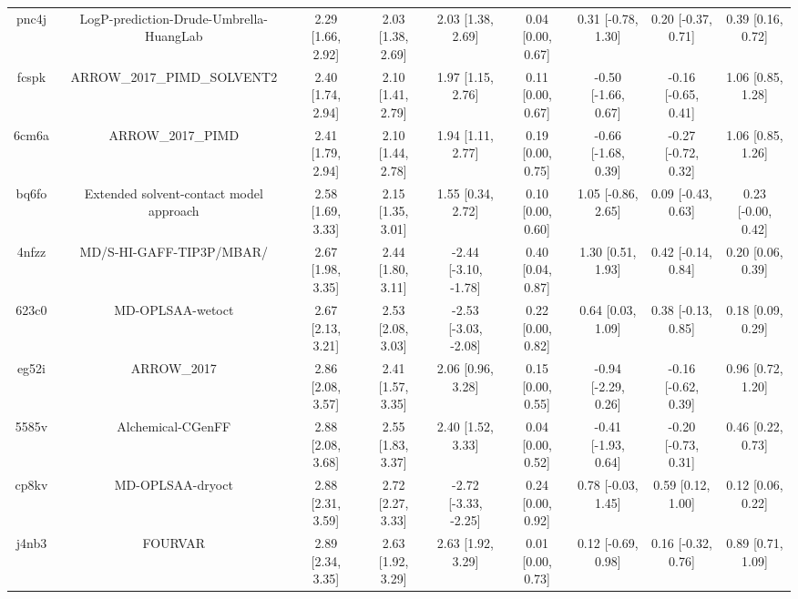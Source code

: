 \documentclass{article}
\begin{document}
\begin{center}
\begin{longtable}{|ccccccccc|}
 pnc4j &            LogP-prediction-Drude-Umbrella-HuangLab &  2.29 [1.66, 2.92] &  2.03 [1.38, 2.69] &     2.03 [1.38, 2.69] &  0.04 [0.00, 0.67] &   0.31 [-0.78, 1.30] &   0.20 [-0.37, 0.71] &     0.39 [0.16, 0.72] \\
 fcspk &                        ARROW\_2017\_PIMD\_SOLVENT2 &  2.40 [1.74, 2.94] &  2.10 [1.41, 2.79] &     1.97 [1.15, 2.76] &  0.11 [0.00, 0.67] &  -0.50 [-1.66, 0.67] &  -0.16 [-0.65, 0.41] &     1.06 [0.85, 1.28] \\
 6cm6a &                                  ARROW\_2017\_PIMD &  2.41 [1.79, 2.94] &  2.10 [1.44, 2.78] &     1.94 [1.11, 2.77] &  0.19 [0.00, 0.75] &  -0.66 [-1.68, 0.39] &  -0.27 [-0.72, 0.32] &     1.06 [0.85, 1.26] \\
 bq6fo &            Extended solvent-contact model approach &  2.58 [1.69, 3.33] &  2.15 [1.35, 3.01] &     1.55 [0.34, 2.72] &  0.10 [0.00, 0.60] &   1.05 [-0.86, 2.65] &   0.09 [-0.43, 0.63] &    0.23 [-0.00, 0.42] \\
 4nfzz &                           MD/S-HI-GAFF-TIP3P/MBAR/ &  2.67 [1.98, 3.35] &  2.44 [1.80, 3.11] &  -2.44 [-3.10, -1.78] &  0.40 [0.04, 0.87] &    1.30 [0.51, 1.93] &   0.42 [-0.14, 0.84] &     0.20 [0.06, 0.39] \\
 623c0 &                                   MD-OPLSAA-wetoct &  2.67 [2.13, 3.21] &  2.53 [2.08, 3.03] &  -2.53 [-3.03, -2.08] &  0.22 [0.00, 0.82] &    0.64 [0.03, 1.09] &   0.38 [-0.13, 0.85] &     0.18 [0.09, 0.29] \\
 eg52i &                                        ARROW\_2017 &  2.86 [2.08, 3.57] &  2.41 [1.57, 3.35] &     2.06 [0.96, 3.28] &  0.15 [0.00, 0.55] &  -0.94 [-2.29, 0.26] &  -0.16 [-0.62, 0.39] &     0.96 [0.72, 1.20] \\
 5585v &                                  Alchemical-CGenFF &  2.88 [2.08, 3.68] &  2.55 [1.83, 3.37] &     2.40 [1.52, 3.33] &  0.04 [0.00, 0.52] &  -0.41 [-1.93, 0.64] &  -0.20 [-0.73, 0.31] &     0.46 [0.22, 0.73] \\
 cp8kv &                                   MD-OPLSAA-dryoct &  2.88 [2.31, 3.59] &  2.72 [2.27, 3.33] &  -2.72 [-3.33, -2.25] &  0.24 [0.00, 0.92] &   0.78 [-0.03, 1.45] &    0.59 [0.12, 1.00] &     0.12 [0.06, 0.22] \\
 j4nb3 &                                            FOURVAR &  2.89 [2.34, 3.35] &  2.63 [1.92, 3.29] &     2.63 [1.92, 3.29] &  0.01 [0.00, 0.73] &   0.12 [-0.69, 0.98] &   0.16 [-0.32, 0.76] &     0.89 [0.71, 1.09] \\

\end{longtable}
\end{center}
\end{document}
